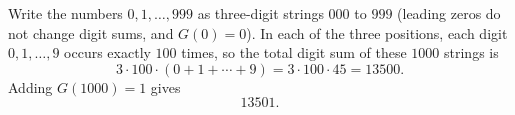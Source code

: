 Write the numbers $0,1,\dots,999$ as three-digit strings $000$ to $999$ (leading zeros do not change digit sums, and $G(0)=0$). In each of the three positions, each digit $0,1,\dots,9$ occurs exactly $100$ times, so the total digit sum of these $1000$ strings is
\[3\cdot100\cdot(0+1+\cdots+9)=3\cdot100\cdot45=13500.\]
Adding $G(1000)=1$ gives
\[\boxed{13501}.\]

